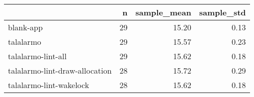 \begin{tabular}{lrrr}
\toprule
{} &   n &  sample\_mean &  sample\_std \\
\midrule
blank-app                      &  29 &        15.20 &        0.13 \\
talalarmo                      &  29 &        15.57 &        0.23 \\
talalarmo-lint-all             &  29 &        15.62 &        0.18 \\
talalarmo-lint-draw-allocation &  28 &        15.72 &        0.29 \\
talalarmo-lint-wakelock        &  28 &        15.62 &        0.18 \\
\bottomrule
\end{tabular}

